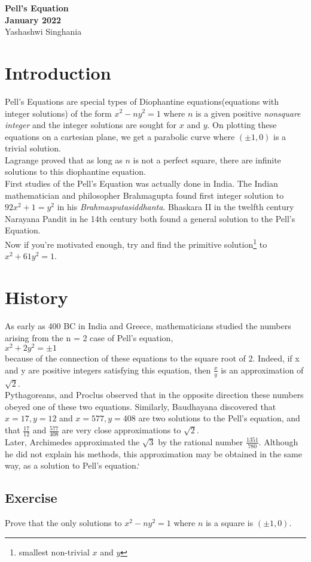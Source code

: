 \documentclass[20pt]{article}
\begin{document}
\begin{titlepage}
\begin{center}
\vspace*{3cm}
\huge{\textbf{Pell's Equation}}\\
\Large{\textbf{January 2022}}\\
\vfill
Yashashwi Singhania\\

\end{center}
\end{titlepage}
\section{Introduction}
Pell's Equations are special types of Diophantine equations(equations with integer solutions) of the form $x^2 - ny^2 =1$ where $n$ is a given positive \textit{nonsquare integer} and the integer solutions are sought for $x$ and $y$. On plotting these equations on a cartesian plane, we get a parabolic curve where $(\pm{1},0)$ is a trivial solution.\\
Lagrange proved that as long as $n$ is not a perfect square, there are infinite solutions to this diophantine equation.\\

First studies of the Pell's Equation was actually done in India.
The Indian mathematician and philosopher Brahmagupta found first integer solution to $92x^2 + 1=y^2$ in his \emph{Brahmasputasiddhanta}. Bhaskara II in the twelfth century Narayana Pandit in he 14th century both found a general solution to the Pell's Equation. \\

Now if you're motivated enough, try and find the primitive solution\footnote{smallest non-trivial $x$ and $y$} to $x^2 + 61y^2 = 1$.

\section{History}

As early as 400 BC in India and Greece, mathematicians studied the numbers arising from the n = 2 case of Pell's equation,\\
$x^2 + 2y^2 = \pm 1$\\
because of the connection of these equations to the square root of 2. Indeed, if x and y are positive integers satisfying this equation, then $\frac{x}{y}$ is an approximation of $\sqrt{2}$.\\
 Pythagoreans, and Proclus observed that in the opposite direction these numbers obeyed one of these two equations. Similarly, Baudhayana discovered that $x = 17, y = 12$ and $x = 577, y = 408$ are two solutions to the Pell's equation, and that $\frac{17}{12}$ and $\frac{577}{408}$ are very close approximations to $\sqrt{2}$.\\
 Later, Archimedes approximated the $\sqrt{3}$ by the rational number $\frac{1351}{780}$. Although he did not explain his methods, this approximation may be obtained in the same way, as a solution to Pell's equation.`\\
 
 \subsection{Exercise}
Prove that the only solutions to $x^2 - ny^2 = 1$ where $n$ is a square is $(\pm 1,0).$
\end{document}
